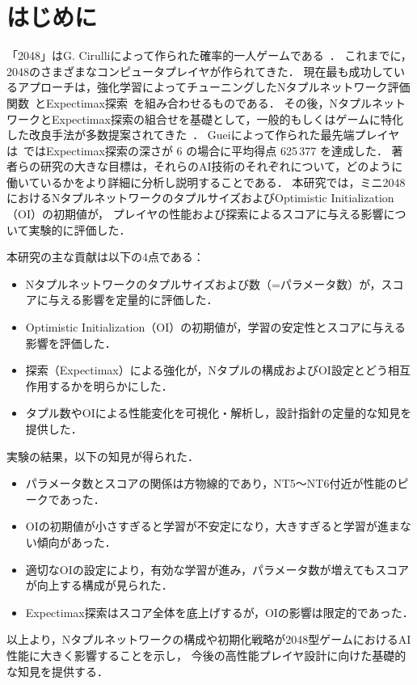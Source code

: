 \section{はじめに}
「2048」はG. Cirulliによって作られた確率的一人ゲームである~\cite{2048}．
これまでに，2048のさまざまなコンピュータプレイヤが作られてきた．
現在最も成功しているアプローチは，強化学習によってチューニングしたNタプルネットワーク評価関数~\cite{SzJa14}とExpectimax探索~\cite{YWHC16}を組み合わせるものである．
その後，NタプルネットワークとExpectimax探索の組合せを基礎として，一般的もしくはゲームに特化した改良手法が多数提案されてきた~\cite{YWHC16,Mats17,Jask17,GuCW22}．
Gueiによって作られた最先端プレイヤは~\cite{GuCW22}ではExpectimax探索の深さが 6 の場合に平均得点 625\,377 を達成した．
著者らの研究の大きな目標は，それらのAI技術のそれぞれについて，どのように働いているかをより詳細に分析し説明することである．
本研究では，ミニ2048におけるNタプルネットワークのタプルサイズおよびOptimistic Initialization（OI）の初期値が，
プレイヤの性能および探索によるスコアに与える影響について実験的に評価した．

\vspace{0.5em}
\noindent 本研究の主な貢献は以下の4点である：
\begin{itemize}
\item Nタプルネットワークのタプルサイズおよび数（=パラメータ数）が，スコアに与える影響を定量的に評価した．
\item Optimistic Initialization（OI）の初期値が，学習の安定性とスコアに与える影響を評価した．
\item 探索（Expectimax）による強化が，Nタプルの構成およびOI設定とどう相互作用するかを明らかにした．
\item タプル数やOIによる性能変化を可視化・解析し，設計指針の定量的な知見を提供した．
\end{itemize}

実験の結果，以下の知見が得られた．
\begin{itemize}
\item パラメータ数とスコアの関係は方物線的であり，NT5～NT6付近が性能のピークであった．
\item OIの初期値が小さすぎると学習が不安定になり，大きすぎると学習が進まない傾向があった．
\item 適切なOIの設定により，有効な学習が進み，パラメータ数が増えてもスコアが向上する構成が見られた．
\item Expectimax探索はスコア全体を底上げするが，OIの影響は限定的であった．
\end{itemize}

以上より，Nタプルネットワークの構成や初期化戦略が2048型ゲームにおけるAI性能に大きく影響することを示し，
今後の高性能プレイヤ設計に向けた基礎的な知見を提供する．
